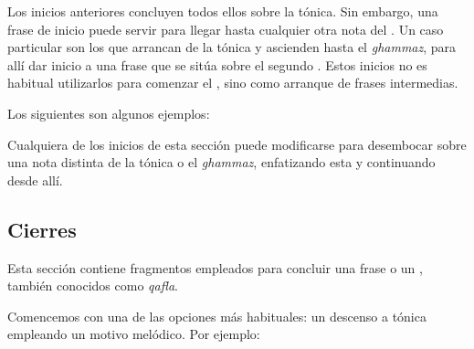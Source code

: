Los inicios anteriores concluyen todos ellos sobre la tónica. Sin embargo, una frase de inicio puede servir para llegar hasta cualquier otra nota del \maqamb. Un caso particular son los que arrancan de la tónica y ascienden hasta el \emph{ghammaz}, para allí dar inicio a una frase que se sitúa sobre el segundo \yins. Estos inicios no es habitual utilizarlos para comenzar el \taqsimb, sino como arranque de frases intermedias.

Los siguientes son algunos ejemplos:


\begin{center}
\end{center}



\begin{center}
\end{center}


Cualquiera de los inicios de esta sección puede modificarse para desembocar sobre una nota distinta de la tónica o el \emph{ghammaz}, enfatizando esta y continuando desde allí.


\subsection{Cierres}
\label{cierres}

Esta sección contiene fragmentos empleados para concluir una frase o un \taqsimb, también conocidos como \emph{qafla}.

Comencemos con una de las opciones más habituales: un descenso a tónica empleando un motivo melódico. Por ejemplo:


\begin{center}
\end{center}


